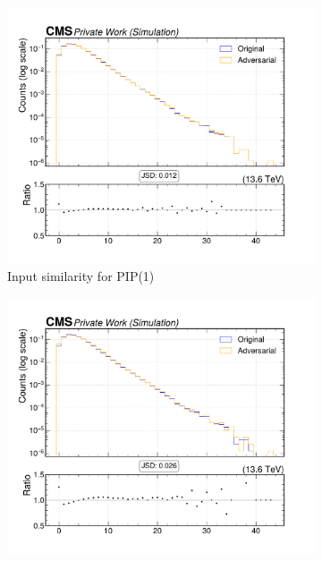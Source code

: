 \begin{figure}[htbp]
  \centering
  \begin{subfigure}[t]{0.32\textwidth}
    \includegraphics[width=\linewidth]{media/output/features/compare/intprob_1/cmp_global_features_n_Npfcand.pdf}
    \caption{Input similarity for PIP(1)}
  \end{subfigure}\hfill
  \begin{subfigure}[t]{0.32\textwidth}
    \includegraphics[width=\linewidth]{media/output/features/compare/intprob_2/cmp_global_features_n_Npfcand.pdf}

\end{subfigure}
\end{figure}
